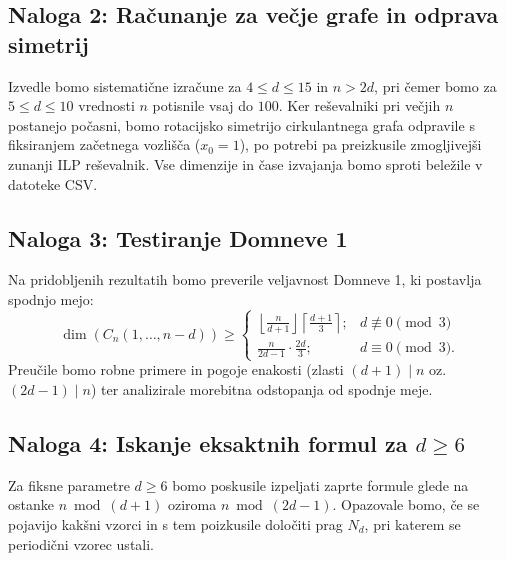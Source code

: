 \documentclass[a4paper,12pt]{article}
\theoremstyle{definition}
\begin{document}
\subsection{Naloga 2: Računanje za večje grafe in odprava simetrij}
Izvedle bomo sistematične izračune za $4 \leq d \leq 15$ in $n > 2d$, pri čemer bomo za $5 \leq d \leq 10$ vrednosti 
$n$ potisnile vsaj do $100$. Ker reševalniki pri večjih $n$ postanejo počasni, bomo rotacijsko simetrijo cirkulantnega 
grafa odpravile s fiksiranjem začetnega vozlišča ($x_0 = 1$), po potrebi pa preizkusile zmogljivejši zunanji ILP 
reševalnik. Vse dimenzije in čase izvajanja bomo sproti beležile v datoteke CSV.

\subsection{Naloga 3: Testiranje Domneve 1}
Na pridobljenih rezultatih bomo preverile veljavnost Domneve 1, ki postavlja spodnjo mejo:
\[
\dim(C_n(1, \dots, n-d)) \geq 
\begin{cases}
\left\lfloor \frac{n}{d+1} \right\rfloor \left\lceil \frac{d+1}{3} \right\rceil; & d \not\equiv 0 \pmod 3 \\[2mm]
\frac{n}{2d-1} \cdot \frac{2d}{3}; & d \equiv 0 \pmod 3.
\end{cases}
\]
Preučile bomo robne primere in pogoje enakosti (zlasti $(d+1) \mid n$ oz. $(2d-1) \mid n$) ter analizirale morebitna 
odstopanja od spodnje meje.

\subsection{Naloga 4: Iskanje eksaktnih formul za $d \geq 6$}
Za fiksne parametre $d \geq 6$ bomo poskusile izpeljati zaprte formule glede na ostanke $n \bmod (d+1)$ oziroma 
$n \bmod (2d-1)$. Opazovale bomo, če se pojavijo kakšni vzorci in s tem poizkusile določiti prag $N_d$, pri katerem
se periodični vzorec ustali.
\end{document}
